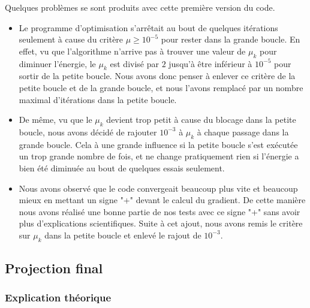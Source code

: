 Quelques problèmes se sont produits avec cette première version du code.
\begin{itemize}
    \item Le programme d'optimisation s'arrêtait au bout de quelques itérations seulement à cause du critère $\mu \ge 10^{-5}$ pour rester dans la grande boucle. En effet, vu que l'algorithme n'arrive pas à trouver une valeur de $\mu_k$ pour diminuer l'énergie, le $\mu_k$ est divisé par $2$ jusqu'à être inférieur à $10^{-5}$ pour sortir de la petite boucle. Nous avons donc penser à enlever ce critère de la petite boucle et de la grande boucle, et nous l'avons remplacé par un nombre maximal d'itérations dans la petite boucle.
    \item De même, vu que le $\mu_k$ devient trop petit à cause du blocage dans la petite boucle, nous avons décidé de rajouter $10^{-3}$ à $\mu_k$ à chaque passage dans la grande boucle. Cela à une grande influence si la petite boucle s'est exécutée un trop grande nombre de fois, et ne change pratiquement rien si l'énergie a bien été diminuée au bout de quelques essais seulement.
    \item Nous avons observé que le code convergeait beaucoup plus vite et beaucoup mieux en mettant un signe "+" devant le calcul du gradient. De cette manière nous avons réalisé une bonne partie de nos tests avec ce signe "+" sans avoir plus d'explications scientifiques. Suite à cet ajout, nous avons remis le critère sur $\mu_k$ dans la petite boucle et enlevé le rajout de $10^{-3}$.
\end{itemize}

\subsection{Projection final}

\subsubsection{Explication théorique}

